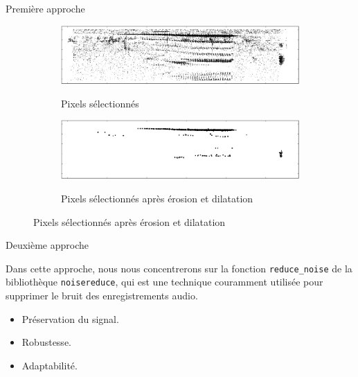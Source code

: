 \documentclass[compress,xcolor=table]{beamer}
\begin{document}
\begin{frame}{Première approche}
\begin{figure}[ht]
        \begin{subfigure}[b]{0.45\textwidth}
            \centering
            \caption*{Pixels sélectionnés}
            \includegraphics[width=\textwidth]{../images/chunks.selected_pixels.png}
            \label{fig:chunks.selected_columns}
        \end{subfigure}
        \hfill
        \begin{subfigure}[b]{0.45\textwidth}
            \centering
            \caption*{Pixels sélectionnés après érosion et dilatation}
            \includegraphics[width=\textwidth]{../images/chunks.selected_pixels_erosion_dilation.png}
            \label{fig:chunks.selected_pixels_erosion_dilation}
        \end{subfigure}
    \end{figure}


\end{frame}

\begin{frame}{Deuxième approche}

    \begin{block}{ \cite{sprengelAudioBasedBird2016}}
        Dans cette approche, nous nous concentrerons sur la fonction \texttt{reduce\_noise} de la bibliothèque \texttt{noisereduce}, qui est une technique couramment utilisée pour supprimer le bruit des enregistrements audio.

        \begin{itemize}
            \item Préservation du signal. 
            \item Robustesse.
            \item Adaptabilité.
        \end{itemize}
    \end{block}


\end{frame}
\end{document}
